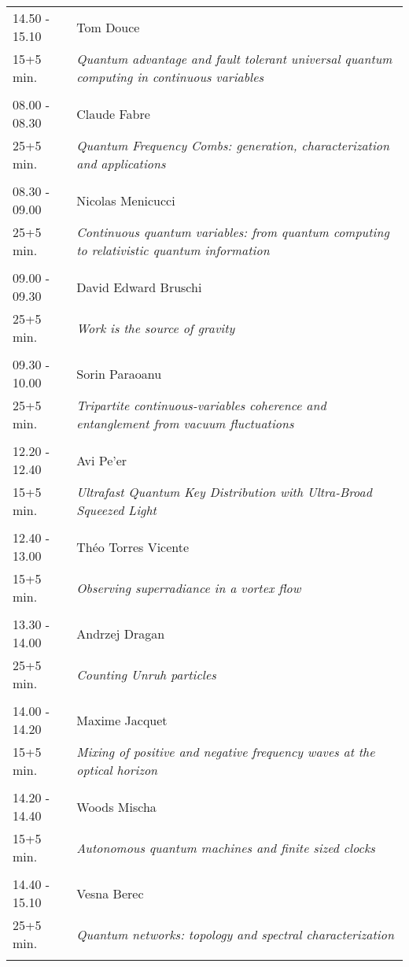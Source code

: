 \begin{longtable}{p{3cm}p{13cm}}
14.50 - 15.10 & Tom Douce\\ 
15+5 min. & {\it Quantum advantage and fault tolerant universal quantum computing in continuous variables}\\ 
 & \\ 
08.00 - 08.30 & Claude Fabre\\ 
25+5 min. & {\it Quantum Frequency Combs: generation, characterization and applications}\\ 
 & \\ 
08.30 - 09.00 & Nicolas Menicucci\\ 
25+5 min. & {\it Continuous quantum variables: from quantum computing to relativistic quantum information}\\ 
 & \\ 
09.00 - 09.30 & David Edward Bruschi\\ 
25+5 min. & {\it Work is the source of gravity}\\ 
 & \\ 
09.30 - 10.00 & Sorin Paraoanu\\ 
25+5 min. & {\it Tripartite continuous-variables coherence and entanglement from vacuum fluctuations}\\ 
 & \\ 
12.20 - 12.40 & Avi Pe'er\\ 
15+5 min. & {\it Ultrafast Quantum Key Distribution with Ultra-Broad Squeezed Light}\\ 
 & \\ 
12.40 - 13.00 & Théo Torres Vicente\\ 
15+5 min. & {\it Observing superradiance in a vortex flow}\\ 
 & \\ 
13.30 - 14.00 & Andrzej Dragan\\ 
25+5 min. & {\it Counting Unruh particles}\\ 
 & \\ 
14.00 - 14.20 & Maxime Jacquet\\ 
15+5 min. & {\it Mixing of positive and negative frequency waves at the optical horizon}\\ 
 & \\ 
14.20 - 14.40 & Woods Mischa\\ 
15+5 min. & {\it Autonomous quantum machines and finite sized clocks}\\ 
 & \\ 
14.40 - 15.10 & Vesna Berec\\ 
25+5 min. & {\it Quantum networks: topology and spectral characterization}\\ 
 & \\ 
\end{longtable}

